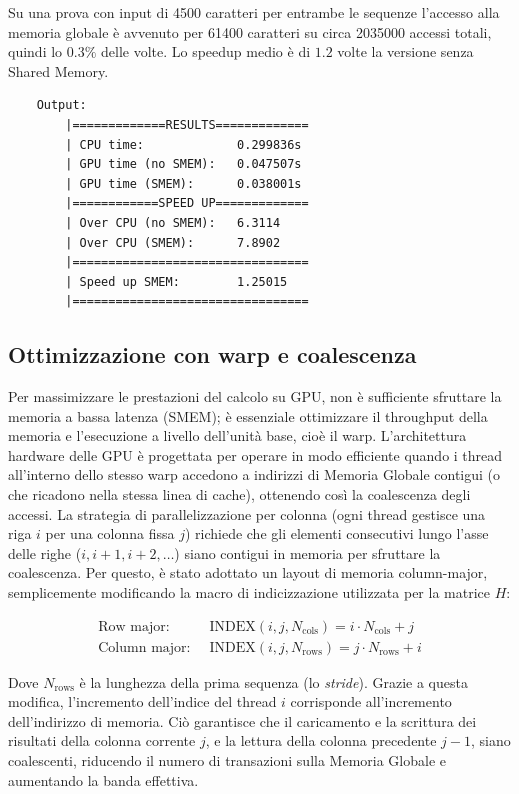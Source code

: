 \documentclass[a4paper,12pt]{article}
\begin{document}
Su una prova con input di 4500 caratteri per entrambe le sequenze l'accesso alla memoria globale è avvenuto per 61400 caratteri su circa 2035000 accessi totali, quindi lo $0.3\%$ delle volte.
Lo speedup medio è di $1.2$ volte la versione senza Shared Memory.

\begin{lstlisting}
    Output:
        |=============RESULTS=============
        | CPU time:             0.299836s
        | GPU time (no SMEM):   0.047507s
        | GPU time (SMEM):      0.038001s
        |============SPEED UP=============
        | Over CPU (no SMEM):   6.3114
        | Over CPU (SMEM):      7.8902
        |=================================
        | Speed up SMEM:        1.25015
        |=================================
\end{lstlisting}
\subsection{Ottimizzazione con warp e coalescenza}

Per massimizzare le prestazioni del calcolo su GPU, non è sufficiente sfruttare la memoria a bassa latenza (SMEM); è essenziale ottimizzare il throughput della memoria e l'esecuzione a livello dell'unità base, cioè il warp.
L'architettura hardware delle GPU è progettata per operare in modo efficiente quando i thread all'interno dello stesso warp accedono a indirizzi di Memoria Globale contigui (o che ricadono nella stessa linea di cache), ottenendo così la coalescenza degli accessi.
La strategia di parallelizzazione per colonna (ogni thread gestisce una riga $i$ per una colonna fissa $j$) richiede che gli elementi consecutivi lungo l'asse delle righe ($i, i+1, i+2, \dots$) siano contigui in memoria per sfruttare la coalescenza. Per questo, è stato adottato un layout di memoria column-major, semplicemente modificando la macro di indicizzazione utilizzata per la matrice $H$:

\begin{align*}
    \text{Row major:} \;\; &\text{INDEX}(i, j, N_{\text{cols}}) = i \cdot N_{\text{cols}} + j\\
    \text{Column major:} \;\; &\text{INDEX}(i, j, N_{\text{rows}}) = j \cdot N_{\text{rows}} + i
\end{align*}


Dove $N_{\text{rows}}$ è la lunghezza della prima sequenza (lo \textit{stride}).
Grazie a questa modifica, l'incremento dell'indice del thread $i$ corrisponde all'incremento dell'indirizzo di memoria. Ciò garantisce che il caricamento e la scrittura dei risultati della colonna corrente $j$, e la lettura della colonna precedente $j-1$, siano coalescenti, riducendo il numero di transazioni sulla Memoria Globale e aumentando la banda effettiva.
\end{document}
